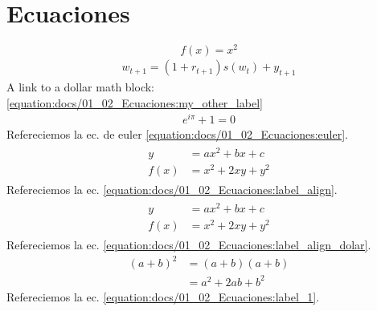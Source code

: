 \documentclass[letterpaper,10pt,english]{jupyterBook}
\begin{document}
\section{Ecuaciones}
\label{\detokenize{docs/01_02_Ecuaciones:ecuaciones}}\label{\detokenize{docs/01_02_Ecuaciones::doc}}\label{equation:docs/01_02_Ecuaciones:677f3939-8a33-420e-bf8b-a9355753849c}\begin{equation} 
    f(x) = x^2 
\end{equation}\begin{equation}\label{equation:docs/01_02_Ecuaciones:my_other_label}
\begin{split}
    w_{t+1} = (1 + r_{t+1}) s(w_t) + y_{t+1}
\end{split}
\end{equation}
\sphinxAtStartPar
A link to a dollar math block: \eqref{equation:docs/01_02_Ecuaciones:my_other_label}
\begin{equation}\label{equation:docs/01_02_Ecuaciones:euler}
\begin{split}        e^{i\pi} + 1 = 0\end{split}
\end{equation}
\sphinxAtStartPar
Refereciemos la ec. de euler \eqref{equation:docs/01_02_Ecuaciones:euler}.
\begin{equation}\label{equation:docs/01_02_Ecuaciones:label_align}
\begin{split}        \begin{align}
        y    & =  ax^2 + bx + c \\
        f(x) & =  x^2 + 2xy + y^2 
        \end{align}\end{split}
\end{equation}
\sphinxAtStartPar
Refereciemos la ec. \eqref{equation:docs/01_02_Ecuaciones:label_align}.
\begin{equation}\label{equation:docs/01_02_Ecuaciones:label_align_dolar}
\begin{split}
    \begin{aligned}
    y    & =  ax^2 + bx + c \\
    f(x) & =  x^2 + 2xy + y^2 
    \end{aligned}
\end{split}
\end{equation}
\sphinxAtStartPar
Refereciemos la ec. \eqref{equation:docs/01_02_Ecuaciones:label_align_dolar}.
\begin{equation}\label{equation:docs/01_02_Ecuaciones:label_1}
\begin{split}        (a + b)^2  &=  (a + b)(a + b) \\
                   &=  a^2 + 2ab + b^2\end{split}
\end{equation}
\sphinxAtStartPar
Refereciemos la ec. \eqref{equation:docs/01_02_Ecuaciones:label_1}.
\end{document}
